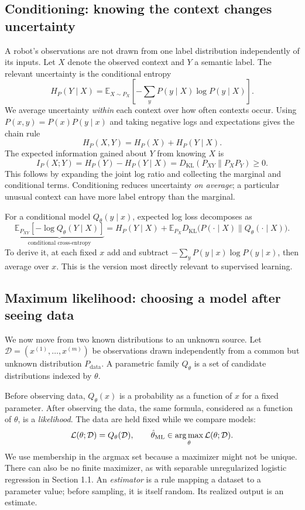 \subsection{Conditioning: knowing the context changes uncertainty}
A robot's observations are not drawn from one label distribution independently
of its inputs. Let $X$ denote the observed context and $Y$ a semantic label.
The relevant uncertainty is the conditional entropy
\[
H_P(Y\mid X)=\mathbb E_{X\sim P_X}
\left[-\sum_y P(y\mid X)\log P(y\mid X)\right].
\]
We average uncertainty \emph{within} each context over how often contexts occur.
Using $P(x,y)=P(x)P(y\mid x)$ and taking negative logs and expectations gives the
chain rule
\[
H_P(X,Y)=H_P(X)+H_P(Y\mid X).
\]
The expected information gained about $Y$ from knowing $X$ is
\[
I_P(X;Y)=H_P(Y)-H_P(Y\mid X)
=D_{\mathrm{KL}}(P_{XY}\|P_XP_Y)\geq0.
\]
This follows by expanding the joint log ratio and collecting the marginal and
conditional terms. Conditioning reduces uncertainty \emph{on average}; a
particular unusual context can have more label entropy than the marginal.

For a conditional model $Q_\theta(y\mid x)$, expected log loss decomposes as
\begin{equation}
\underbrace{\mathbb E_{P_{XY}}[-\log Q_\theta(Y\mid X)]}_{\text{conditional cross-entropy}}
=H_P(Y\mid X)+
\mathbb E_{P_X}D_{\mathrm{KL}}\bigl(P(\cdot\mid X)\|Q_\theta(\cdot\mid X)\bigr).
\label{eq:info12-conditional}
\end{equation}
To derive it, at each fixed $x$ add and subtract
$-\sum_yP(y\mid x)\log P(y\mid x)$, then average over $x$.
This is the version most directly relevant to supervised learning.

\subsection{Maximum likelihood: choosing a model after seeing data}
We now move from two known distributions to an unknown source. Let
$\mathcal D=(x^{(1)},\ldots,x^{(m)})$ be observations drawn independently from a
common but unknown distribution $P_{\mathrm{data}}$. A parametric family
$Q_\theta$ is a set of candidate distributions indexed by $\theta$.

Before observing data, $Q_\theta(x)$ is a probability as a function of $x$ for a
fixed parameter. After observing the data, the same formula, considered as a
function of $\theta$, is a \emph{likelihood}. The data are held fixed while we
compare models:
\[
\mathcal L(\theta;\mathcal D)
=Q_\theta(\mathcal D),\qquad
\hat\theta_{\mathrm{ML}}\in\operatorname*{arg\,max}_\theta\mathcal L(\theta;\mathcal D).
\]
We use membership in the argmax set because a maximizer might not be unique.
There can also be no finite maximizer, as with separable unregularized logistic
regression in Section 1.1. An \emph{estimator} is a rule mapping a dataset to a
parameter value; before sampling, it is itself random. Its realized output is
an estimate.

